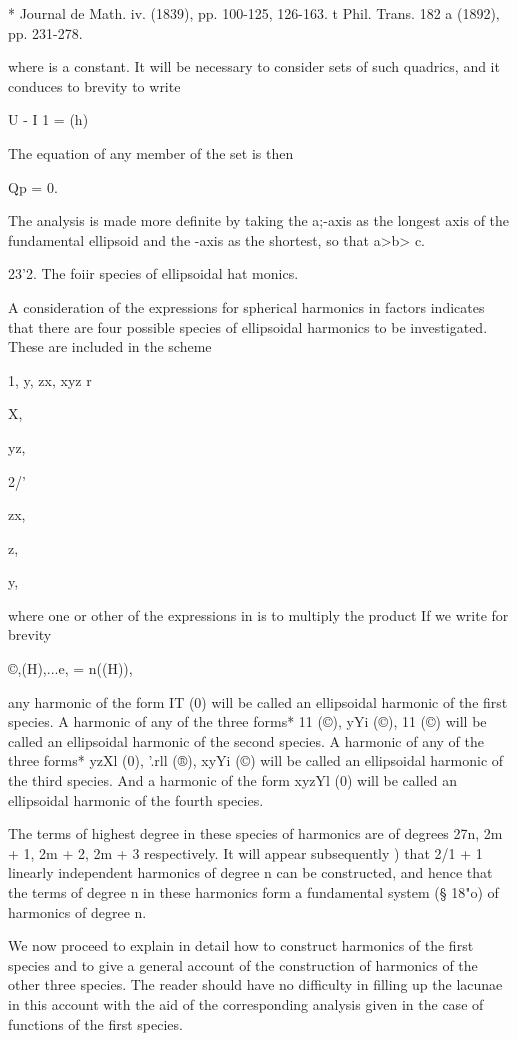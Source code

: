 * Journal de Math. iv. (1839), pp. 100-125, 126-163. t Phil. Trans.
182 a (1892), pp. 231-278.

%
%

where is a constant. It will be necessary to consider sets of such
quadrics, and it conduces to brevity to write

U - I 1 = (h)

The equation of any member of the set is then

Qp = 0.

The analysis is made more definite by taking the a;-axis as the
longest axis of the fundamental ellipsoid and the -axis as the
shortest, so that a>b> c.

23'2. The foiir species of ellipsoidal hat monics.

A consideration of the expressions for spherical harmonics in factors
indicates that there are four possible species of ellipsoidal
harmonics to be investigated. These are included in the scheme

1, y, zx, xyz r%

X,

yz,

2/'

zx,

z,

 y,

where one or other of the expressions in is to multiply the product If
we write for brevity

©,(H),...e, = n((H)),

any harmonic of the form IT (0) will be called an ellipsoidal harmonic
of the first species. A harmonic of any of the three forms* 11 (©),
yYi (©), 11 (©) will be called an ellipsoidal harmonic of the second
species. A harmonic of any of the three forms* yzXl (0), '.rll (®),
xyYi (©) will be called an ellipsoidal harmonic of the third species.
And a harmonic of the form xyzYl (0) will be called an ellipsoidal
harmonic of the fourth species.

The terms of highest degree in these species of harmonics are of
degrees 27n, 2m + 1, 2m + 2, 2m + 3 respectively. It will appear
subsequently ) that 2/1 + 1 linearly independent harmonics of
degree n can be constructed, and hence that the terms of degree n in
these harmonics form a fundamental system (§ 18"o) of harmonics of
degree n.

We now proceed to explain in detail how to construct harmonics of the
first species and to give a general account of the construction of
harmonics of the other three species. The reader should have no
difficulty in filling up the lacunae in this account with the aid of
the corresponding analysis given in the case of functions of the first
species.

